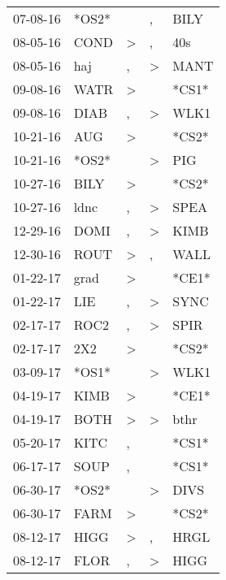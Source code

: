 \begin{supertabular}{lllll}
 07-08-16 &  *OS2* &                  &                , &   BILY \\
 08-05-16 &   COND &     \textgreater &                , &    40s \\
 08-05-16 &    haj &                , &     \textgreater &   MANT \\
 09-08-16 &   WATR &     \textgreater &                  &  *CS1* \\
 09-08-16 &   DIAB &                , &     \textgreater &   WLK1 \\
 10-21-16 &    AUG &     \textgreater &                  &  *CS2* \\
 10-21-16 &  *OS2* &                  &     \textgreater &    PIG \\
 10-27-16 &   BILY &     \textgreater &                  &  *CS2* \\
 10-27-16 &   ldnc &                , &     \textgreater &   SPEA \\
 12-29-16 &   DOMI &                , &     \textgreater &   KIMB \\
 12-30-16 &   ROUT &     \textgreater &                , &   WALL \\
 01-22-17 &   grad &     \textgreater &                  &  *CE1* \\
 01-22-17 &    LIE &                , &     \textgreater &   SYNC \\
 02-17-17 &   ROC2 &                , &     \textgreater &   SPIR \\
 02-17-17 &    2X2 &     \textgreater &                  &  *CS2* \\
 03-09-17 &  *OS1* &                  &     \textgreater &   WLK1 \\
 04-19-17 &   KIMB &     \textgreater &                  &  *CE1* \\
 04-19-17 &   BOTH &     \textgreater &     \textgreater &   bthr \\
 05-20-17 &   KITC &                , &                  &  *CS1* \\
 06-17-17 &   SOUP &                , &                  &  *CS1* \\
 06-30-17 &  *OS2* &                  &     \textgreater &   DIVS \\
 06-30-17 &   FARM &     \textgreater &                  &  *CS2* \\
 08-12-17 &   HIGG &     \textgreater &                , &   HRGL \\
 08-12-17 &   FLOR &                , &     \textgreater &   HIGG \\

\end{supertabular}
